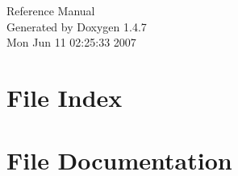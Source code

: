 \documentclass[a4paper]{book}
\begin{document}
\begin{titlepage}
\vspace*{7cm}
\begin{center}
{\Large Reference Manual}\\
\vspace*{1cm}
{\large Generated by Doxygen 1.4.7}\\
\vspace*{0.5cm}
{\small Mon Jun 11 02:25:33 2007}\\
\end{center}
\end{titlepage}
\clearemptydoublepage
{}
\tableofcontents
\clearemptydoublepage
{}
\chapter{File Index}

\chapter{File Documentation}








\printindex
\end{document}
